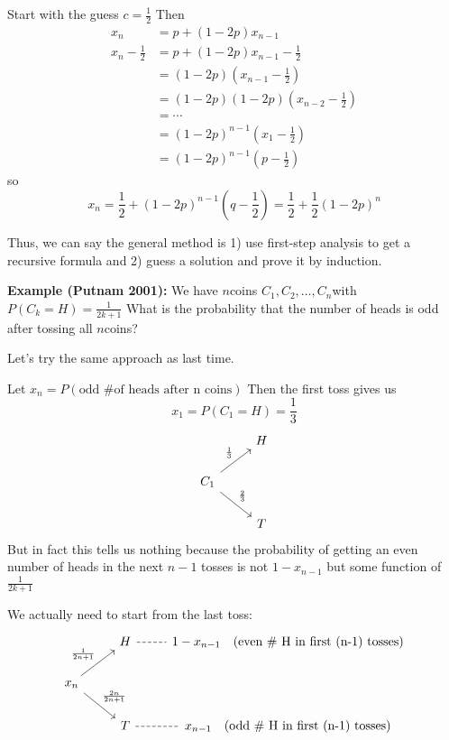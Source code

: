 \documentclass[12pt]{report}
\begin{document}
    Start with the guess $c = \frac{1}{2}$ Then 
    \begin{align*}
        x_n &= p + (1 - 2p)x_{n-1}\\
        x_n - \frac{1}{2} &= p + (1 - 2p)x_{n-1} - \frac{1}{2}\\ 
        &= (1 - 2p)(x_{n-1} - \frac{1}{2})\\ 
        &= (1 - 2p)(1 - 2p)(x_{n-2} - \frac{1}{2})\\ 
        &= \cdots\\
        &= (1 - 2p)^{n-1}(x_1 - \frac{1}{2})\\
        &= (1 - 2p)^{n-1}(p - \frac{1}{2})
    \end{align*}
    so 
    \[\boxed{x_n = \frac{1}{2} + (1 - 2p)^{n-1}(q - \frac{1}{2}) = \frac{1}{2} + \frac{1}{2}(1 - 2p)^n}\]

    Thus, we can say the general method is 1) use first-step analysis to get a recursive formula and 2) guess a solution and prove it by induction.

    \textbf{Example (Putnam 2001):} We have $n$coins $C_1, C_2, \ldots, C_n$with $P(C_k = H) = \frac{1}{2k + 1}$ What is the probability that the number of heads is odd after tossing all $n$coins?

    Let's try the same approach as last time.

    Let $x_n = P(\text{odd \# of heads after n coins})$ Then the first toss gives us 
    \[x_1 = P(C_1 = H) = \frac{1}{3}\]
    \[\begin{tikzcd}
        & H\\
        C_{1} \arrow[ur, "\frac{1}{3}"] \arrow[dr, "\frac{2}{3}"] &\\
        & T 
    \end{tikzcd}\]
    But in fact this tells us nothing because the probability of getting an even number of heads in the next $n-1$ tosses is not $1 - x_{n-1}$ but some function of $\frac{1}{2k+1}$ 

    We actually need to start from the last toss:
    \[\begin{tikzcd}
        & H \arrow[r, dashed, no head] & 1 - x_{n-1} \quad \text{(even \# H in first (n-1) tosses)}\\ 
        x_{n} \arrow[ur, "{\frac{1}{2n+1}}"] \arrow[dr, "{\frac{2n}{2n+1}}"] &\\
        & T \arrow[r, dashed, no head] & x_{n-1} \quad \text{(odd \# H in first (n-1) tosses)}
    \end{tikzcd}\]
\end{document}
